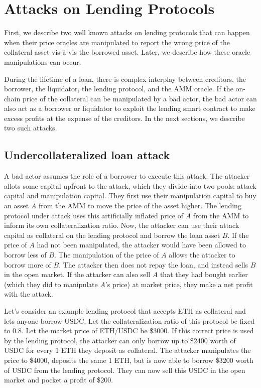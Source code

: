 \section{Attacks on Lending Protocols}
First, we describe two well known attacks on lending protocols that can happen when their price oracles are manipulated to report the wrong price of the collateral asset vis-à-vis the borrowed asset. Later, we describe how these oracle manipulations can occur. 

During the lifetime of a loan, there is complex interplay between creditors, the borrower, the liquidator, the lending protocol, and the AMM oracle. If the on-chain price of the collateral can be manipulated by a bad actor, the bad actor can also act as a borrower or liquidator to exploit the lending smart contract to make excess profits at the expense of the creditors. In the next sections, we describe two such attacks.

\subsection{Undercollateralized loan attack \label{SectionUndercollAttack}}
A bad actor assumes the role of a borrower to execute this attack. The attacker allots some capital upfront to the attack, which they divide into two pools: attack capital and manipulation capital. They first use their manipulation capital to buy an asset $A$ from the AMM to move the price of the asset higher. The lending protocol under attack uses this artificially inflated price of $A$ from the AMM to inform its own collateralization ratio. Now, the attacker can use their attack capital as collateral on the lending protocol and borrow the loan asset $B$. If the price of $A$ had not been manipulated, the attacker would have been allowed to borrow less of $B$. The manipulation of the price of $A$ allows the attacker to borrow more of $B$. The attacker then does not repay the loan, and instead sells $B$ in the open market. If the attacker can also sell $A$ that they had bought earlier (which they did to manipulate $A$'s price) at market price, they make a net profit with the attack.

Let's consider an example lending protocol that accepts ETH as collateral and lets anyone borrow USDC. Let the collateralization ratio of this protocol be fixed to 0.8. Let the market price of ETH/USDC be \$3000. If this correct price is used by the lending protocol, the attacker can only borrow up to \$2400 worth of USDC for every 1 ETH they deposit as collateral. The attacker manipulates the price to \$4000, deposits the same 1 ETH, but is now able to borrow \$3200 worth of USDC from the lending protocol. They can now sell this USDC in the open market and pocket a profit of \$200. 

